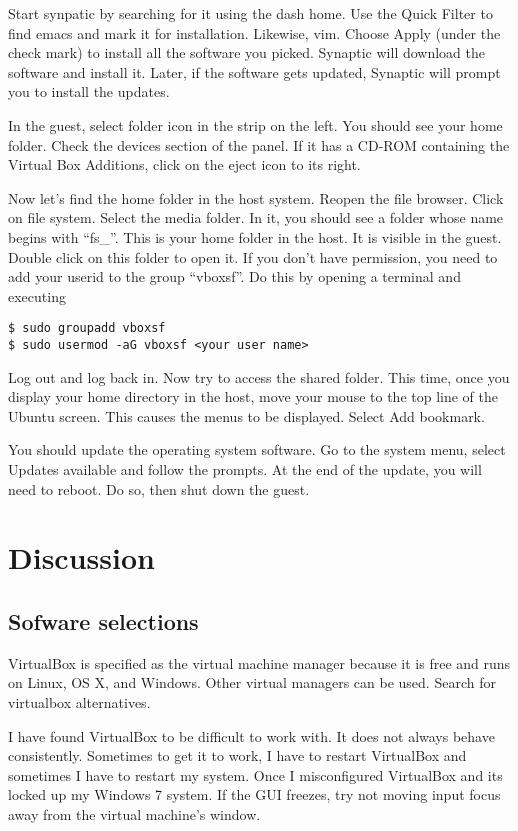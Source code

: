 \documentclass{article}
\begin{document}
Start synpatic by searching for it using the dash home. Use the Quick
Filter to find emacs and mark it for installation. Likewise,
vim. Choose Apply (under the check mark) to install all the software you
picked. Synaptic will download the software and install it. Later, if
the software gets updated, Synaptic will prompt you to install the
updates.

In the guest, select folder icon in the strip on the left. You should
see your home folder. Check the devices section of the panel. If it has
a CD-ROM containing the Virtual Box Additions, click on the eject icon
to its right.

Now let's find the home folder in the host system. Reopen the file
browser. Click on file system. Select the media folder. In it, you
should see a folder whose name begins with ``fs\_''. This is your home
folder in the host. It is visible in the guest. Double click on this
folder to open it. If you don't have permission, you need to add your
userid to the group ``vboxsf''. Do this by opening a terminal and
executing

\begin{verbatim}
$ sudo groupadd vboxsf
$ sudo usermod -aG vboxsf <your user name>
\end{verbatim}

Log out and log back in. Now try to access the shared folder. This time,
once you display your home directory in the host, move your mouse to the
top line of the Ubuntu screen. This causes the menus to be displayed.
Select Add bookmark.

You should update the operating system
software. Go to the system menu, select Updates available and follow the
prompts. At the end of the update, you will need to reboot. Do so, then
shut down the guest.



\section{Discussion}

\subsection{Sofware selections}

VirtualBox is specified as the virtual machine manager because it is
free and runs on Linux, OS X, and Windows. Other virtual managers can be
used. Search for virtualbox alternatives.

I have found VirtualBox to be difficult to work with. It does not always behave
consistently. Sometimes to get it to work, I have to restart VirtualBox and sometimes I
have to restart my system. Once I misconfigured VirtualBox and its
locked up my Windows 7 system. If the GUI freezes, try not moving input
focus away from the virtual machine's window.
\end{document}
